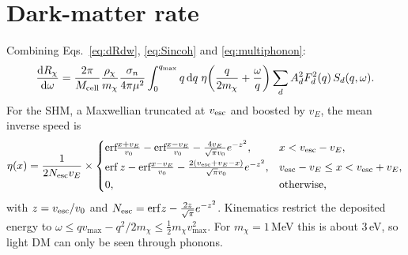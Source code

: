 \documentclass[11pt,a4paper]{article}
\numberwithin{equation}{section}
\newcommand{\dd}{\mathrm{d}}
\newcommand{\mchi}{m_\chi}
\begin{document}
\section{Dark-matter rate}
Combining Eqs.~\eqref{eq:dRdw}, \eqref{eq:Sincoh} and \eqref{eq:multiphonon}:
\begin{equation}
  \frac{\dd R_\chi}{\dd\omega} = \frac{2\pi}{M_{\rm cell}}\frac{\rho_\chi}{\mchi}
  \frac{\sigma_n}{4\pi\mu^2}\int_0^{q_{\max}} q\,\dd q\;\eta\!\left(\frac{q}{2\mchi}+\frac\omega q\right)
  \sum_d A_d^2F_d^2(q)\,S_d(q,\omega).
\end{equation}
For the SHM, a Maxwellian truncated at $v_{\rm esc}$ and boosted by $v_E$, the mean inverse
speed is
\begin{equation}
  \eta(x)=\frac{1}{2N_{\rm esc}v_E}\times
  \begin{cases}
    \mathrm{erf}\!\frac{x+v_E}{v_0}-\mathrm{erf}\!\frac{x-v_E}{v_0}-\frac{4v_E}{\sqrt\pi v_0}e^{-z^2},
      & x<v_{\rm esc}-v_E,\\[4pt]
    \mathrm{erf}\,z-\mathrm{erf}\!\frac{x-v_E}{v_0}-\frac{2(v_{\rm esc}+v_E-x)}{\sqrt\pi v_0}e^{-z^2},
      & v_{\rm esc}-v_E\le x<v_{\rm esc}+v_E,\\[2pt]
    0, & \text{otherwise,}
  \end{cases}
\end{equation}
with $z=v_{\rm esc}/v_0$ and $N_{\rm esc}=\mathrm{erf}z-\frac{2z}{\sqrt\pi}e^{-z^2}$.
Kinematics restrict the deposited energy to
$\omega\le q v_{\max}-q^2/2\mchi\le\frac12\mchi v_{\max}^2$. For $\mchi=1$\,MeV this is
about 3\,eV, so light DM can only be seen through phonons.

\end{document}
